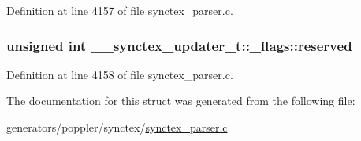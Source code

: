 Definition at line 4157 of file synctex\+\_\+parser.\+c.

\hypertarget{struct____synctex__updater__t_1_1__flags_aa2305297befe75aa440a913f1814af30}{
\subsubsection[{reserved}]{\setlength{\rightskip}{0pt plus 5cm}unsigned int \+\_\+\+\_\+synctex\+\_\+updater\+\_\+t\+::\+\_\+flags\+::reserved}}\label{struct____synctex__updater__t_1_1__flags_aa2305297befe75aa440a913f1814af30}


Definition at line 4158 of file synctex\+\_\+parser.\+c.



The documentation for this struct was generated from the following file\+:\begin{DoxyCompactItemize}
\item 
generators/poppler/synctex/\hyperlink{synctex__parser_8c}{synctex\+\_\+parser.\+c}\end{DoxyCompactItemize}

